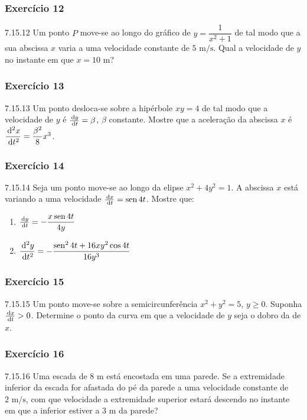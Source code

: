 \subsubsection*{Exercício 12}
\begin{exercicio}[12]{7.15.12}
Um ponto $P$ move-se ao longo do gráfico de $y = \dfrac{1}{x^2 + 1}$ de tal modo que a sua abscissa $x$ varia a uma velocidade constante de $5\text{ m/s}$. Qual a velocidade de $y$ no instante em que $x = 10\text{ m}$?
\end{exercicio}

\subsubsection*{Exercício 13}
\begin{exercicio}[13]{7.15.13}
Um ponto desloca-se sobre a hipérbole $xy = 4$ de tal modo que a velocidade de $y$ é $\frac{\,\mathrm{d} y}{\,\mathrm{d} t} = \beta$, $\beta$ constante. Mostre que a aceleração da abscissa $x$ é $\dfrac{\,\mathrm{d}^2x}{\,\mathrm{d} t^2} = \dfrac{\beta^2}{8}x^3$.
\end{exercicio}

\subsubsection*{Exercício 14}
\begin{exercicio}[14]{7.15.14}
Seja um ponto move-se ao longo da elipse $x^2 + 4y^2 = 1$. A abscissa $x$ está variando a uma velocidade $\frac{\,\mathrm{d} x}{\,\mathrm{d} t} = \operatorname{sen} 4t$. Mostre que:
\begin{enumerate}[label=\alph*)]
    \item $\frac{\,\mathrm{d} y}{\,\mathrm{d} t} = -\dfrac{x\operatorname{sen} 4t}{4y}$
    \item $\dfrac{\,\mathrm{d}^2y}{\,\mathrm{d} t^2} = -\dfrac{\operatorname{sen}^2 4t + 16xy^2 \cos 4t}{16y^3}$
\end{enumerate}
\end{exercicio}

\subsubsection*{Exercício 15}
\begin{exercicio}[15]{7.15.15}
Um ponto move-se sobre a semicircunferência $x^2 + y^2 = 5$, $y \ge 0$. Suponha $\frac{\,\mathrm{d} x}{\,\mathrm{d} t} > 0$. Determine o ponto da curva em que a velocidade de $y$ seja o dobro da de $x$.
\end{exercicio}

\subsubsection*{Exercício 16}
\begin{exercicio}[16]{7.15.16}
Uma escada de $8\text{ m}$ está encostada em uma parede. Se a extremidade inferior da escada for afastada do pé da parede a uma velocidade constante de $2\text{ m/s}$, com que velocidade a extremidade superior estará descendo no instante em que a inferior estiver a $3\text{ m}$ da parede?
\end{exercicio}

